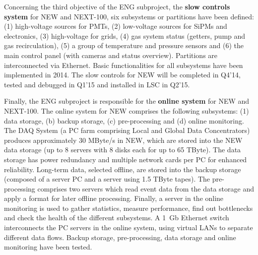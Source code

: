 
Concerning the third objective of the ENG subproject, the {\bf slow controls system} for NEW and NEXT-100, six subsystems or partitions have been defined: (1) high-voltage sources for PMTs, (2) low-voltage sources for SiPMs and electronics, (3) high-voltage for grids, (4) gas system status (getters, pump and gas recirculation), (5) a group of temperature and pressure sensors and (6) the main control panel (with cameras and status overview). Partitions are interconnected via Ethernet. Basic functionalities for all subsystems have been implemented in 2014. The slow controls for NEW will be completed in Q4’14, tested and debugged in Q1’15 and installed in LSC in Q2’15.





Finally, the ENG subproject is responsible for the {\bf online system} for NEW and NEXT-100. The online system for NEW comprises the following subsystems: (1) data storage, (b) backup storage, (c) pre-processing and (d) online monitoring. The DAQ System (a PC farm comprising Local and Global Data Concentrators) produces approximately 30 MByte/s in NEW, which are stored into the NEW data storage (up to 8 servers with 8 disks each for up to 65 TByte). The data storage has power redundancy and multiple network cards per PC for enhanced reliability. Long-term data, selected offline, are stored into the backup storage (composed of a server PC and a server using 1.5 TByte tapes). The pre-processing comprises two servers which read event data from the data storage and apply a format for later offline processing. Finally, a server in the online monitoring is used to gather statistics, measure performance, find out bottlenecks and check the health of the different subsystems. A 1~Gb Ethernet switch interconnects the PC servers in the online system, using virtual LANs to separate different data flows. Backup storage, pre-processing, data storage and online monitoring have been tested.

